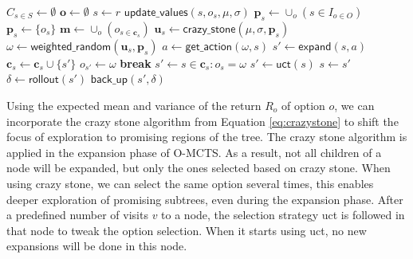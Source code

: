 \begin{algorithm}
	\caption{$\mathsf{OL-MCTS}(O, r, t, d, v, \mu, \sigma)$}
	\label{alg:olmcts}
	\begin{algorithmic}[1]
		\State $C_{s \in S} \gets \emptyset$
		\State $\mathbf{o} \gets \emptyset$
		 \label{alg:olmcts:mainloop}
			\State $s \gets r$
			 \label{alg:olmcts:innerloop}
				 \label{alg:olmcts:sp}
					\State $\mathsf{update\_values}(s, o_s, \mu, \sigma)$
						 \label{alg:olmcts:update}
					\State $\mathbf{p}_s \gets \cup_o (s \in I_{o \in O})$
				\Else
					\State $\mathbf{p}_s \gets \{o_s\}$
				\EndIf \label{alg:olmcts:scs}
				\State $\mathbf{m} \gets \cup_o (o_{s \in \mathbf{c}_s})$
				  
					\label{alg:olmcts:ns}
					\State $\mathbf{u}_s \gets \mathsf{crazy\_stone}(\mu, \sigma, \mathbf{p}_s)$
					\State $\omega \gets \mathsf{weighted\_random}(\mathbf{u}_s, \mathbf{p}_s)$
					 
						\State $a \gets \mathsf{get\_action}(\omega, s)$ \label{alg:olmcts:scs}
						\State $s' \gets \mathsf{expand}(s, a)$ 
						\State $\mathbf{c}_s \gets \mathbf{c}_s \cup \{s'\}$
						\State $o_{s'} \gets \omega$
						\State \textbf{break} \label{alg:olmcts:ecs}
					\Else {}
						\State $s' \gets s \in \mathbf{c}_s : o_s = \omega$ \label{alg:olmcts:s}
					\EndIf
				\Else {}
					\State $s' \gets \mathsf{uct}(s)$ \label{alg:olmcts:uct}
				\EndIf \label{alg:olmcts:ecs}
				\State $s \gets s'$ \label{alg:olmcts:ss}
			\EndWhile
			\State $\delta \gets \mathsf{rollout}(s')$ \label{alg:olmcts:rollout}
			\State $\mathsf{back\_up}(s', \delta)$ \label{alg:olmcts:backup}
		\EndWhile
	\end{algorithmic}
\end{algorithm}

Using the expected mean and variance of the return $R_o$ of option $o$, we can
incorporate the  crazy stone
algorithm from Equation \ref{eq:crazystone} to shift the focus of exploration to
promising regions of the tree. The crazy stone algorithm is applied in the
expansion phase of O-MCTS. As a result, not all children of a node will be
expanded, but only the ones selected based on crazy stone. When using crazy
stone, we can select the same option several times, this enables deeper
exploration of promising subtrees, even during the expansion phase. After a
predefined number of visits $v$ to a node, the selection strategy \textsf{uct}
is followed in that node to tweak the option selection. When it starts using
\textsf{uct}, no new expansions will be done in this node.

